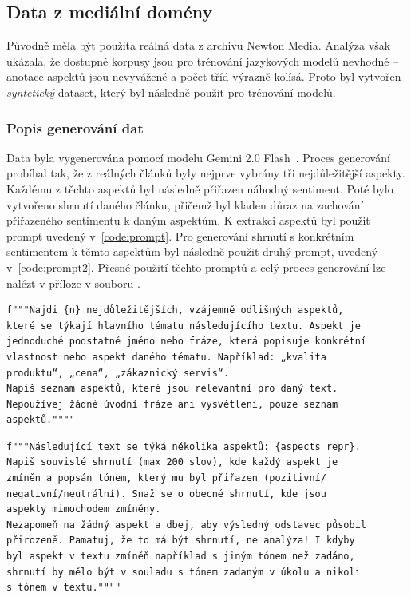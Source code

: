 \subsection{Data z mediální domény}\label{datasetmedia}
Původně měla být použita reálná data z archivu Newton Media. Analýza však ukázala, že dostupné korpusy jsou pro trénování jazykových modelů nevhodné -- anotace aspektů jsou nevyvážené a počet tříd výrazně kolísá. Proto byl vytvořen \emph{syntetický} dataset, který byl následně použit pro trénování modelů.

\subsubsection{Popis generování dat}
Data byla vygenerována pomocí modelu Gemini 2.0 Flash~\cite{Gemini}. Proces generování probíhal tak, že z reálných článků byly nejprve vybrány tři nejdůležitější aspekty. Každému z těchto aspektů byl následně přiřazen náhodný sentiment. Poté bylo vytvořeno shrnutí daného článku, přičemž byl kladen důraz na zachování přiřazeného sentimentu k daným aspektům. K extrakci aspektů byl použit prompt uvedený v~\ref{code:prompt}. Pro generování shrnutí s konkrétním sentimentem k těmto aspektům byl následně použit druhý prompt, uvedený v~\ref{code:prompt2}. Přesné použití těchto promptů a celý proces generování lze nalézt v příloze v souboru .

\begin{listing}[ht]
\begin{verbatim}
f"""Najdi {n} nejdůležitějších, vzájemně odlišných aspektů, 
které se týkají hlavního tématu následujícího textu. Aspekt je 
jednoduché podstatné jméno nebo fráze, která popisuje konkrétní 
vlastnost nebo aspekt daného tématu. Například: „kvalita 
produktu“, „cena“, „zákaznický servis“.
Napiš seznam aspektů, které jsou relevantní pro daný text. 
Nepoužívej žádné úvodní fráze ani vysvětlení, pouze seznam 
aspektů.""""
\end{verbatim}
\caption[Ukázka promptu pro extrakci nejdůležitějších aspektů]%
{Ukázka promptu pro extrakci nejdůležitějších aspektů, vlastní práce}
\label{code:prompt}
\end{listing}

\begin{listing}[ht]
\begin{verbatim}
f"""Následující text se týká několika aspektů: {aspects_repr}.
Napiš souvislé shrnutí (max 200 slov), kde každý aspekt je 
zmíněn a popsán tónem, který mu byl přiřazen (pozitivní/
negativní/neutrální). Snaž se o obecné shrnutí, kde jsou 
aspekty mimochodem zmíněny.
Nezapomeň na žádný aspekt a dbej, aby výsledný odstavec působil 
přirozeně. Pamatuj, že to má být shrnutí, ne analýza! I kdyby 
byl aspekt v textu zmíněň například s jiným tónem než zadáno, 
shrnutí by mělo být v souladu s tónem zadaným v úkolu a nikoli 
s tónem v textu.""""
\end{verbatim}
\caption[Ukázka promptu pro generaci shrnutí]%
{Ukázka promptu pro generaci shrnutí, kde se dbá na daný sentiment k daným aspektům, vlastní práce}
\label{code:prompt2}
\end{listing}

